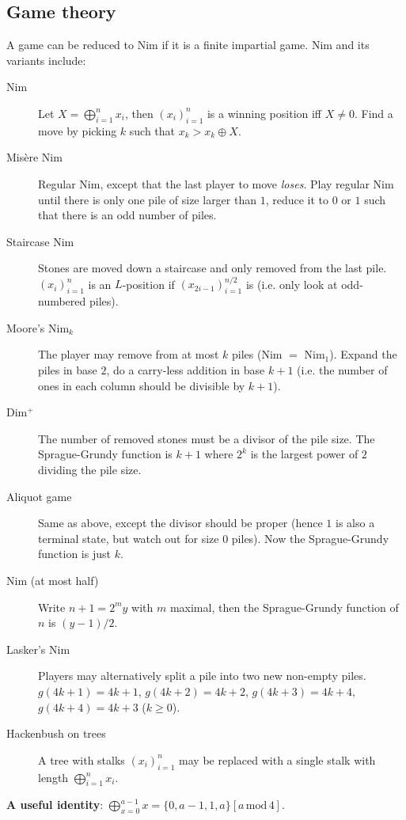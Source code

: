 \documentclass[8pt,a4paper,landscape,oneside]{amsart}
\begin{document}
\begin{multicols*}{3}
\subsection{Game theory}

A game can be reduced to Nim if it is a finite impartial game. Nim and its variants include:
\begin{description}
	\item[Nim] Let $X = \bigoplus_{i=1}^n x_i$, then $(x_i)_{i=1}^n$ is a winning position iff $X\neq 0$. Find a move by picking $k$ such that $x_k > x_k \oplus X$.
	\item[Mis\`{e}re Nim] Regular Nim, except that the last player to move \textit{loses}. Play regular Nim until there is only one pile of size larger than $1$, reduce it to $0$ or $1$ such that there is an odd number of piles.
	\item[Staircase Nim] Stones are moved down a staircase and only removed from the last pile. $(x_i)_{i=1}^n$ is an $L$-position if $(x_{2i-1})_{i=1}^{n/2}$ is (i.e. only look at odd-numbered piles).
	\item[Moore's Nim$_k$] The player may remove from at most $k$ piles (Nim $=$ Nim$_1$). Expand the piles in base $2$, do a carry-less addition in base $k+1$ (i.e. the number of ones in each column should be divisible by $k+1$).
	\item[Dim$^+$] The number of removed stones must be a divisor of the pile size. The Sprague-Grundy function is $k+1$ where $2^k$ is the largest power of $2$ dividing the pile size.
	\item[Aliquot game] Same as above, except the divisor should be proper (hence $1$ is also a terminal state, but watch out for size $0$ piles). Now the Sprague-Grundy function is just $k$.
	\item[Nim (at most half)] Write $n+1 = 2^my$ with $m$ maximal, then the Sprague-Grundy function of $n$ is $(y - 1) / 2$.
	\item[Lasker's Nim] Players may alternatively split a pile into two new non-empty piles. $g(4k+1) = 4k+1$, $g(4k+2) = 4k+2$, $g(4k+3) = 4k+4$, $g(4k+4) = 4k+3$ ($k\geq 0$).
	\item[Hackenbush on trees] A tree with stalks $(x_i)_{i=1}^n$ may be replaced with a single stalk with length $\bigoplus_{i=1}^n x_i$.
\end{description}

\textbf{A useful identity}: $\bigoplus_{x=0}^{a - 1} x = \{0, a - 1, 1, a\}[a \, \mathrm{mod} \, 4]$.


\end{multicols*}
\end{document}
